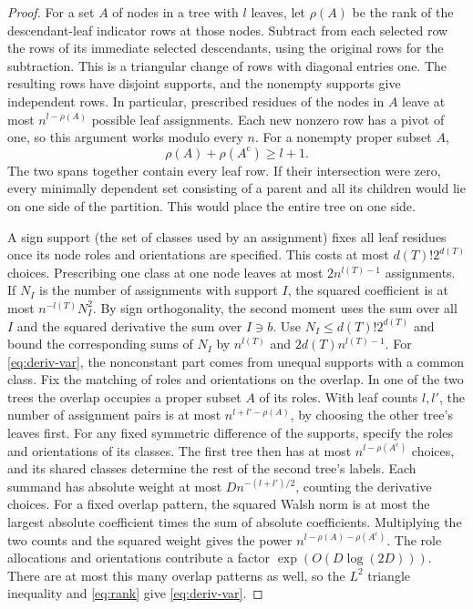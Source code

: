 \documentclass[preprints,article,submit,oneauthor]{Definitions/mdpi}
\begin{document}
\begin{proof}
For a set \(A\) of nodes in a tree with \(l\) leaves, let \(\rho(A)\)
be the rank of the descendant-leaf indicator rows at those nodes.
Subtract from each selected row the rows of its immediate selected
descendants, using the original rows for the subtraction. This is
a triangular change of rows with diagonal entries one. The resulting
rows have disjoint supports, and the nonempty supports give
independent rows. In particular, prescribed
residues of the nodes in \(A\) leave at most \(n^{l-\rho(A)}\) possible
leaf assignments. Each new nonzero row has a pivot of one, so this
argument works modulo every \(n\). For a nonempty proper subset \(A\),
\begin{equation}\label{eq:rank}
 \rho(A)+\rho(A^{\mathrm c})\ge l+1.
\end{equation}
The two spans together contain every leaf row. If their intersection
were zero, every minimally dependent set consisting of a parent and
all its children would lie on one side of the partition. This would
place the entire tree on one side.

A sign support (the set of classes used by an assignment) fixes all
leaf residues once its node roles and orientations are specified.
This costs at most \(d(T)!2^{d(T)}\) choices. Prescribing one class at
one node leaves at most \(2n^{l(T)-1}\) assignments. If \(N_I\) is the
number of assignments with support \(I\), the squared coefficient is
at most \(n^{-l(T)}N_I^2\). By sign orthogonality, the second moment
uses the sum over all \(I\) and the squared derivative the sum over
\(I\ni b\). Use \(N_I\le d(T)!2^{d(T)}\) and bound the corresponding
sums of \(N_I\) by \(n^{l(T)}\) and \(2d(T)n^{l(T)-1}\).
For \eqref{eq:deriv-var}, the nonconstant part comes from unequal
supports with a common class. Fix the matching of roles and
orientations on the overlap. In one of the two trees the overlap
occupies a proper subset \(A\) of its roles. With leaf counts \(l,l'\),
the number of assignment pairs is at most \(n^{l+l'-\rho(A)}\), by
choosing the other tree's leaves first. For any fixed symmetric
difference of the supports, specify the roles and orientations of
its classes. The first tree then has at most \(n^{l-\rho(A^{\mathrm c})}\)
choices, and its shared classes determine the rest of the second
tree's labels. Each summand has absolute weight at most
\(D n^{-(l+l')/2}\), counting the derivative choices. For a fixed
overlap pattern, the squared Walsh norm is at most the largest
absolute coefficient times the sum of absolute coefficients.
Multiplying the two counts and the squared weight gives the power
\(n^{l-\rho(A)-\rho(A^{\mathrm c})}\). The role allocations and
orientations contribute a factor \(\exp(O(D\log(2D)))\). There are at most
this many overlap patterns as well, so the \(L^2\) triangle
inequality and \eqref{eq:rank} give \eqref{eq:deriv-var}.


\end{proof}
\end{document}
